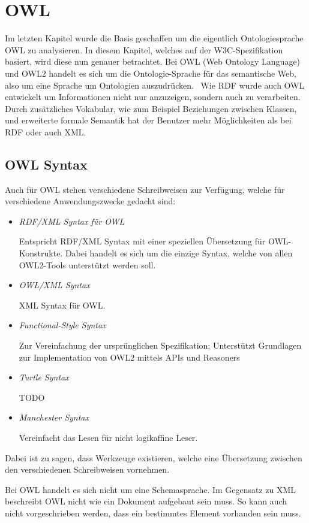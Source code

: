 \chapter{OWL}
\label{chap:owl}

Im letzten Kapitel wurde die Basis geschaffen um die eigentlich Ontologiesprache OWL zu analysieren. In diesem Kapitel, welches auf der W3C-Spezifikation~\cite{w3owl} basiert, wird diese nun genauer betrachtet. Bei OWL (Web Ontology Language) und OWL2 handelt es sich um die Ontologie-Sprache für das semantische Web, also um eine Sprache um Ontologien auszudrücken.~\cite{cambSemOWL} Wie RDF wurde auch OWL entwickelt um Informationen nicht nur anzuzeigen, sondern auch zu verarbeiten. Durch zusätzliches Vokabular, wie zum Beispiel Beziehungen zwischen Klassen, und erweiterte formale Semantik hat der Benutzer mehr Möglichkeiten als bei RDF oder auch XML.

\section{OWL Syntax}
\label{sec:owl_owl_syntax}
Auch für OWL stehen verschiedene Schreibweisen zur Verfügung, welche für verschiedene Anwendungszwecke gedacht sind:
\begin{itemize}
	\item \textit{RDF/XML Syntax für OWL}

        Entspricht RDF/XML Syntax mit einer speziellen Übersetzung für OWL-Konstrukte. Dabei handelt es sich um die einzige Syntax, welche von allen OWL2-Tools unterstützt werden soll. %
	\item \textit{OWL/XML Syntax}

        XML Syntax für OWL.
	\item \textit{Functional-Style Syntax}

        Zur Vereinfachung der ursprünglichen Spezifikation; Unterstützt Grundlagen zur Implementation von OWL2 mittels APIs und Reasoners
	\item \textit{Turtle Syntax}

        TODO
	\item \textit{Manchester Syntax}

        Vereinfacht das Lesen für nicht logikaffine Leser.
\end{itemize}

Dabei ist zu sagen, dass Werkzeuge existieren, welche eine Übersetzung zwischen den verschiedenen Schreibweisen vornehmen.

Bei OWL handelt es sich nicht um eine Schemasprache. Im Gegensatz zu XML beschreibt OWL nicht wie ein Dokument aufgebaut sein muss. So kann auch nicht vorgeschrieben werden, dass ein bestimmtes Element vorhanden sein muss.


